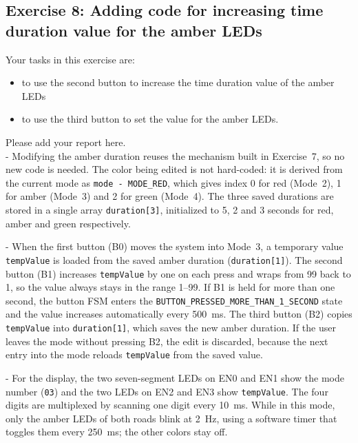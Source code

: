 \subsection{Exercise 8: Adding code for increasing time duration value for the amber LEDs}

Your tasks in this exercise are: 
\begin{itemize}
    \item to use the second button to increase the time duration value of the amber LEDs
    \item to use the third button to set the value for the amber LEDs.
\end{itemize}
Please add your report here.\\

- Modifying the amber duration reuses the mechanism built in Exercise~7, so no new code is needed. The color being edited is not hard-coded: it is derived from the current mode as \texttt{mode - MODE\_RED}, which gives index 0 for red (Mode~2), 1 for amber (Mode~3) and 2 for green (Mode~4). The three saved durations are stored in a single array \texttt{duration[3]}, initialized to 5, 2 and 3 seconds for red, amber and green respectively.

- When the first button (B0) moves the system into Mode~3, a temporary value \texttt{tempValue} is loaded from the saved amber duration (\texttt{duration[1]}). The second button (B1) increases \texttt{tempValue} by one on each press and wraps from 99 back to 1, so the value always stays in the range 1--99. If B1 is held for more than one second, the button FSM enters the \texttt{BUTTON\_PRESSED\_MORE\_THAN\_1\_SECOND} state and the value increases automatically every 500~ms. The third button (B2) copies \texttt{tempValue} into \texttt{duration[1]}, which saves the new amber duration. If the user leaves the mode without pressing B2, the edit is discarded, because the next entry into the mode reloads \texttt{tempValue} from the saved value.

- For the display, the two seven-segment LEDs on EN0 and EN1 show the mode number (\texttt{03}) and the two LEDs on EN2 and EN3 show \texttt{tempValue}. The four digits are multiplexed by scanning one digit every 10~ms. While in this mode, only the amber LEDs of both roads blink at 2~Hz, using a software timer that toggles them every 250~ms; the other colors stay off.










